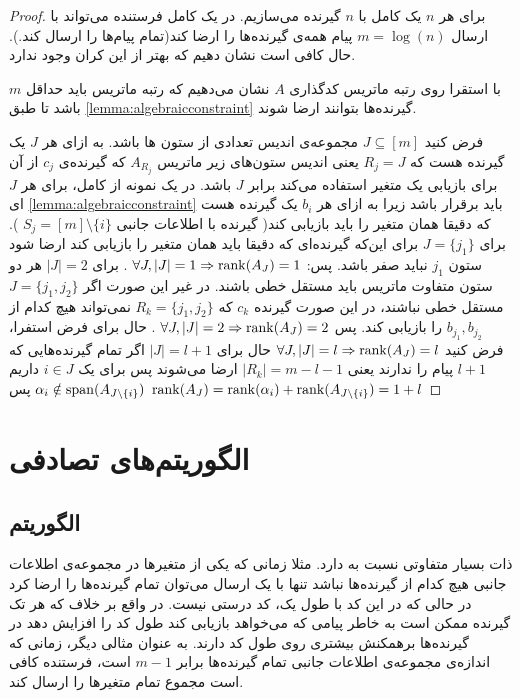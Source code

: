 \begin{proof}
	برای هر
	$n$
	یک 
	\lpicod
	کامل با
	$n$
	گیرنده می‌سازیم. در یک 
	\lpicod
	کامل فرستنده می‌تواند با ارسال
	$m = \log(n)$
	پیام همه‌ی گیرنده‌ها را ارضا کند(تمام پیام‌ها را ارسال کند.). حال کافی است نشان دهیم که بهتر از این کران وجود ندارد.
	
	با استقرا روی رتبه ماتریس کدگذاری 
	$A$
	نشان می‌دهیم که رتبه ماتریس باید حداقل 
	$m$
	باشد تا طبق
	\autoref{lemma:algebraicconstraint}
	گیرنده‌ها بتوانند ارضا شوند.
	
	فرض کنید
	$J \subseteq [m]$
	مجموعه‌ی اندیس تعدادی از ستون ها باشد. به ازای هر
	$J$
	یک گیرنده هست که 
	$R_j = J$
	یعنی اندیس ستون‌های زیر ماتریس
	$A_{R_j}$
	که گیرنده‌ی
	$c_j$
	از آن برای بازیابی یک متغیر استفاده می‌کند برابر
	$J$
	باشد. در یک نمونه از
	\lpicod
	کامل، برای هر
	$J$
	ای 
	\autoref{lemma:algebraicconstraint}
	باید برقرار باشد زیرا به ازای هر
	$b_i$
	یک گیرنده هست که دقیقا همان متغیر را باید بازیابی کند(
	گیرنده با اطلاعات جانبی
	$S_j = [m] \setminus \{i\}$
	). برای
	$J = \{j_1\}$
	برای این‌که گیرنده‌ای که دقیقا باید همان متغیر را بازیابی کند ارضا شود ستون
	$j_1$
	نباید صفر باشد. پس: 
	$\forall J, |J| = 1 \Rightarrow \operatorname{rank}(A_J) = 1$
	. برای
	$|J| = 2$
	هر دو ستون متفاوت ماتریس باید مستقل خطی باشند. در غیر این صورت اگر
	$J = \{j_1, j_2\}$
	مستقل خطی نباشند، در این صورت گیرنده‌
	$c_k$
	که
	$R_k = \{j_1, j_2\}$
	نمی‌تواند هیچ کدام از 
	$b_{j_1}, b_{j_2}$
	را بازیابی کند. پس 
	$\forall J, |J| = 2 \Rightarrow \operatorname{rank}(A_J) = 2$
	. حال برای فرض استفرا، فرض کنید
	$\forall J, |J| = l \Rightarrow \operatorname{rank}(A_J) = l$
	حال برای
	$|J| = l + 1$
	اگر تمام گیرنده‌هایی که
	$l + 1$
	پیام را ندارند یعنی
	$|R_k| = m - l - 1 $
	ارضا می‌شوند پس برای یک
	$i \in J$
	داریم
	$\alpha_i \notin \operatorname{span}(A_{J \setminus \{i\}})$
	پس
	$\operatorname{rank}(A_{J}) = \operatorname{rank}(\alpha_i) + \operatorname{rank}(A_{J \setminus \{i\}}) = 1 + l$
\end{proof}
\section{الگوریتم‌های تصادفی}
\subsection{الگوریتم  }
\picod
ذات بسیار متفاوتی نسبت به
\icod
دارد. مثلا زمانی که یکی از متغیرها در مجموعه‌ی اطلاعات جانبی هیچ کدام از گیرنده‌ها نباشد تنها با یک ارسال می‌توان تمام گیرنده‌ها را ارضا کرد در حالی که در
\icod
این کد با طول یک، کد درستی نیست. در واقع بر خلاف
\icod
که هر تک گیرنده ممکن است به خاطر پیامی که می‌خواهد بازیابی کند طول کد را افزایش دهد در
\picod
گیرنده‌ها برهمکنش بیشتری روی طول کد دارند. به عنوان مثالی دیگر، زمانی که اندازه‌ی مجموعه‌ی اطلاعات جانبی تمام گیرنده‌ها برابر
$m - 1$
است، فرستنده کافی است مجموع تمام متغیرها را ارسال کند. 

